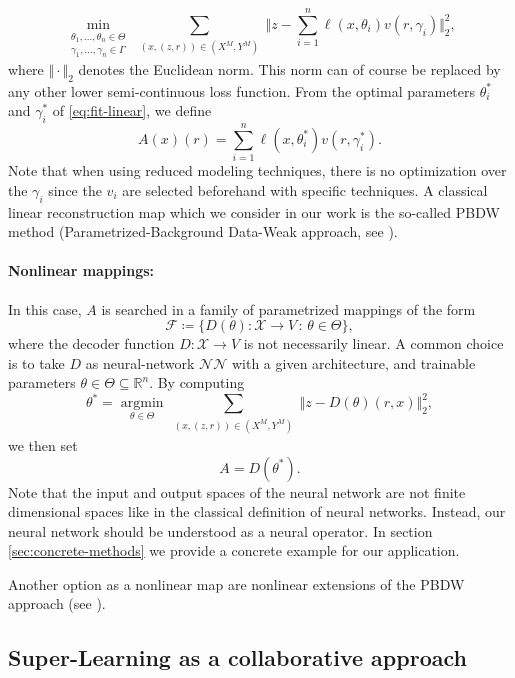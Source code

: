 \documentclass[11pt,a4paper,twoside]{article}
\theoremstyle{definition}
\numberwithin{equation}{section}
\newcommand{\cF}{\ensuremath{\mathcal{F}}}
\newcommand{\cN}{\ensuremath{\mathcal{N}}}
\newcommand{\cX}{\ensuremath{\mathcal{X}}}
\newcommand{\bR}{\ensuremath{\mathbb{R}}}
\newcommand{\<}{\langle}
\renewcommand{\>}{\rangle}
\newcommand{\argmin}{\operatorname{argmin}}
\newcommand{\cond}{\ensuremath{\,:\,}}
\begin{document}
\begin{equation}
\label{eq:fit-linear}
\min_{ \substack{\theta_1,\dots, \theta_n \in \Theta \\ \gamma_1,\dots, \gamma_n \in \Gamma}}
\sum_{ \substack{\left(x,(z, r)\right)\in (X^{M}, Y^{M})}}
\Vert z - \sum_{i=1}^n \ell(x, \theta_i) v(r, \gamma_i) \Vert^2_2,
\end{equation}
where $\Vert \cdot \Vert_2$ denotes the Euclidean norm. This norm can of course be replaced by any other lower semi-continuous loss function. From the optimal parameters $\theta_i^*$ and $\gamma_i^*$ of \eqref{eq:fit-linear}, we define
$$
A(x)(r) = \sum_{i=1}^n \ell(x, \theta_i^*) v(r, \gamma^*_i).
$$
Note that when using reduced modeling techniques, there is no optimization over the $\gamma_i$ since the $v_i$ are selected beforehand with specific techniques. A classical linear reconstruction map which we consider in our work is the so-called PBDW method (Parametrized-Background Data-Weak approach, see \cite{MPPY2015, BCDDPW2017, Mula2023}).

\paragraph{Nonlinear mappings:} In this case, $A$ is searched in a family of parametrized mappings of the form
$$
\cF \coloneqq \{ D(\theta): \cX \to V   \cond \theta \in \Theta  \},
$$
where the decoder function $D:\cX\to V$ is not necessarily linear. A common choice is to take $D$ as neural-network $\cN\cN$ with a given architecture, and trainable parameters $\theta \in \Theta\subseteq \bR^n$. By computing
$$
\theta^*=\underset{\theta \in \Theta}{\argmin}
\sum_{\substack{\left(x,(z, r)\right)\in (X^{M}, Y^{M})}}
\Vert z - D(\theta)(r, x) \Vert^2_2,
$$
we then set
$$
A = D(\theta^*).
$$
Note that the input and output spaces of the neural network are not finite dimensional spaces like in the classical definition of neural networks. Instead, our neural network should be understood as a neural operator. In section \ref{sec:concrete-methods} we provide a concrete example for our application.

Another option as a nonlinear map are nonlinear extensions of the PBDW approach (see \cite{CDMN2022,CDMS2023}).

\subsection{Super-Learning as a collaborative approach}
\label{sec:super-learning}
\end{document}
